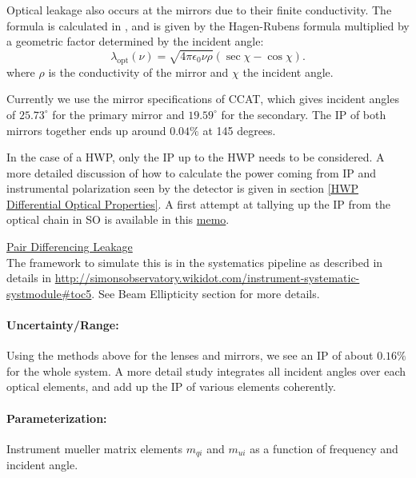 Optical leakage also occurs at the mirrors due to their finite conductivity. 
The formula is calculated in \cite{Barkats:2005sh}, and is given by the Hagen-Rubens formula multiplied by 
a geometric factor determined by the incident angle:
\begin{equation}
\lambda_\text{opt}(\nu) = \sqrt{4 \pi \epsilon_0 \nu \rho} (\sec \chi - \cos \chi).
\end{equation}
where $\rho$ is the conductivity of the mirror and $\chi$ the incident angle.

Currently we use the mirror specifications of CCAT, which gives incident angles of $25.73^\circ$ for the primary mirror 
and $19.59^\circ$ for the secondary. The IP of both mirrors together ends up around $0.04\%$ at 145 degrees.

In the case of a HWP, only the IP up to the HWP needs to be considered.
A more detailed discussion of how to calculate the power coming from IP and instrumental polarization
seen by the detector is given in section \ref{HWP Differential Optical Properties}.
A first attempt at tallying up the IP from the optical chain in SO is available in this \href{http://simonsobservatory.wdfiles.com/local--files/calandsys-telecon/eb_leakage_from_pointing_error.pdf?ukey=61f26ef33e8439a4e7096ab52c54c523066a4e35}{memo}.


\noindent \underline{Pair Differencing Leakage} \\
The framework to simulate this is in the systematics pipeline as described in details in \url{http://simonsobservatory.wikidot.com/instrument-systematic-systmodule#toc5}.
See Beam Ellipticity section for more details.

\paragraph{Uncertainty/Range:}
Using the methods above for the lenses and mirrors, we see an IP of about $0.16\%$ for the whole system.
A more detail study integrates all incident angles over each optical elements, and add up the IP of various elements  coherently.

\paragraph{Parameterization:}
Instrument mueller matrix elements $m_{qi}$ and $m_{ui}$ as a function of frequency and incident angle.


